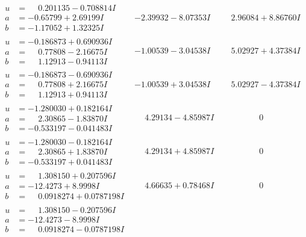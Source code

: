 \documentclass[1p]{elsarticle_modified}
\theoremstyle{definition}
\begin{document}
$$\begin{array}{c|c|c}
\begin{aligned}
u &= \phantom{-}0.201135 - 0.708814 I \\
a &= -0.65799 + 2.69199 I \\
b &= -1.17052 + 1.32325 I\end{aligned}
 & -2.39932 - 8.07353 I & \phantom{-}2.96084 + 8.86760 I \\ \hline\begin{aligned}
u &= -0.186873 + 0.690936 I \\
a &= \phantom{-}0.77808 - 2.16675 I \\
b &= \phantom{-}1.12913 - 0.94113 I\end{aligned}
 & -1.00539 - 3.04538 I & \phantom{-}5.02927 + 4.37384 I \\ \hline\begin{aligned}
u &= -0.186873 - 0.690936 I \\
a &= \phantom{-}0.77808 + 2.16675 I \\
b &= \phantom{-}1.12913 + 0.94113 I\end{aligned}
 & -1.00539 + 3.04538 I & \phantom{-}5.02927 - 4.37384 I \\ \hline\begin{aligned}
u &= -1.280030 + 0.182164 I \\
a &= \phantom{-}2.30865 - 1.83870 I \\
b &= -0.533197 - 0.041483 I\end{aligned}
 & \phantom{-}4.29134 - 4.85987 I & \phantom{-0.000000 } 0 \\ \hline\begin{aligned}
u &= -1.280030 - 0.182164 I \\
a &= \phantom{-}2.30865 + 1.83870 I \\
b &= -0.533197 + 0.041483 I\end{aligned}
 & \phantom{-}4.29134 + 4.85987 I & \phantom{-0.000000 } 0 \\ \hline\begin{aligned}
u &= \phantom{-}1.308150 + 0.207596 I \\
a &= -12.4273 + 8.9998 I \\
b &= \phantom{-}0.0918274 + 0.0787198 I\end{aligned}
 & \phantom{-}4.66635 + 0.78468 I & \phantom{-0.000000 } 0 \\ \hline\begin{aligned}
u &= \phantom{-}1.308150 - 0.207596 I \\
a &= -12.4273 - 8.9998 I \\
b &= \phantom{-}0.0918274 - 0.0787198 I\end{aligned}

\end{array}$$
\end{document}
